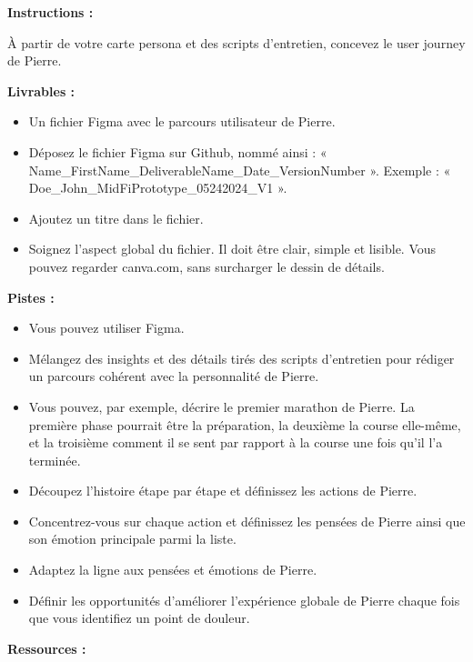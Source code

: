 \makeheaderfiles

\textbf{Instructions :}

À partir de votre carte persona et des scripts d'entretien, concevez le user journey de Pierre.

\textbf{Livrables :}

\begin{itemize}
\item Un fichier Figma avec le parcours utilisateur de Pierre.
\item Déposez le fichier Figma sur Github, nommé ainsi : « Name\_FirstName\_DeliverableName\_Date\_VersionNumber ». Exemple : « Doe\_John\_MidFiPrototype\_05242024\_V1 ».
\item Ajoutez un titre dans le fichier.
\item Soignez l'aspect global du fichier. Il doit être clair, simple et lisible. Vous pouvez regarder canva.com, sans surcharger le dessin de détails.
\end{itemize}

\textbf{Pistes :}

\begin{itemize}
\item Vous pouvez utiliser Figma.
\item Mélangez des insights et des détails tirés des scripts d'entretien pour rédiger un parcours cohérent avec la personnalité de Pierre.
\item Vous pouvez, par exemple, décrire le premier marathon de Pierre. La première phase pourrait être la préparation, la deuxième la course elle-même, et la troisième comment il se sent par rapport à la course une fois qu'il l'a terminée.
\item Découpez l'histoire étape par étape et définissez les actions de Pierre.
\item Concentrez-vous sur chaque action et définissez les pensées de Pierre ainsi que son émotion principale parmi la liste.
\item Adaptez la ligne aux pensées et émotions de Pierre.
\item Définir les opportunités d'améliorer l'expérience globale de Pierre chaque fois que vous identifiez un point de douleur.
\end{itemize}

\textbf{Ressources :}

